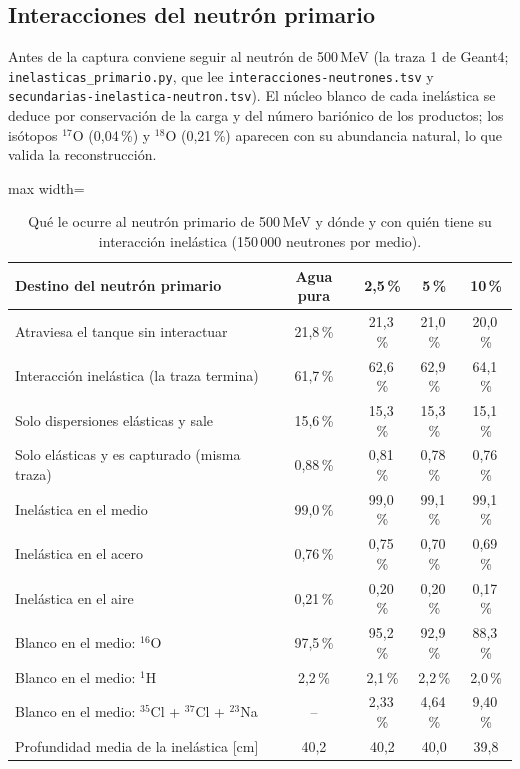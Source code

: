 \documentclass[11pt,a4paper]{article}
\begin{document}
\subsection{Interacciones del neutrón primario}\label{sec:primario}
Antes de la captura conviene seguir al neutrón de 500\,MeV (la traza 1 de Geant4; \texttt{inelasticas\_primario.py}, que lee \texttt{interacciones-neutrones.tsv} y \texttt{secundarias-inelastica-neutron.tsv}).
El núcleo blanco de cada inelástica se deduce por conservación de la carga y del número bariónico de los productos; los isótopos $^{17}$O (0,04\,\%) y $^{18}$O (0,21\,\%) aparecen con su abundancia natural, lo que valida la reconstrucción.
\begin{table}[H]\centering\small\begin{adjustbox}{max width=\linewidth}\begin{tabular}{lcccc}\toprule
Destino del neutrón primario & Agua pura & 2,5\,\% & 5\,\% & 10\,\% \\\midrule
Atraviesa el tanque sin interactuar & 21,8\,\% & 21,3\,\% & 21,0\,\% & 20,0\,\% \\
Interacción inelástica (la traza termina) & 61,7\,\% & 62,6\,\% & 62,9\,\% & 64,1\,\% \\
Solo dispersiones elásticas y sale & 15,6\,\% & 15,3\,\% & 15,3\,\% & 15,1\,\% \\
Solo elásticas y es capturado (misma traza) & 0,88\,\% & 0,81\,\% & 0,78\,\% & 0,76\,\% \\
\midrule Inelástica en el medio & 99,0\,\% & 99,0\,\% & 99,1\,\% & 99,1\,\% \\
Inelástica en el acero & 0,76\,\% & 0,75\,\% & 0,70\,\% & 0,69\,\% \\
Inelástica en el aire & 0,21\,\% & 0,20\,\% & 0,20\,\% & 0,17\,\% \\
Blanco en el medio: $^{16}$O & 97,5\,\% & 95,2\,\% & 92,9\,\% & 88,3\,\% \\
Blanco en el medio: $^{1}$H & 2,2\,\% & 2,1\,\% & 2,2\,\% & 2,0\,\% \\
Blanco en el medio: $^{35}$Cl + $^{37}$Cl + $^{23}$Na & -- & 2,33\,\% & 4,64\,\% & 9,40\,\% \\
Profundidad media de la inelástica [cm] & 40,2 & 40,2 & 40,0 & 39,8 \\
\bottomrule\end{tabular}\end{adjustbox}\caption{Qué le ocurre al neutrón primario de 500\,MeV y dónde y con quién tiene su interacción inelástica (150\,000 neutrones por medio).}\label{tab:primario}\end{table}
\end{document}

